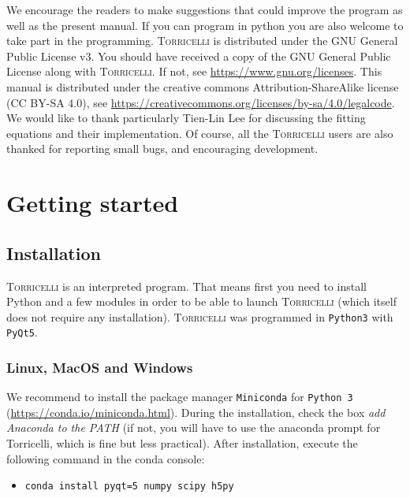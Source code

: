 \documentclass[oldfontcommands,openany,oneside]{memoir}
\begin{document}
We encourage the readers to make suggestions that could improve the program as well as the present manual. If you can program in python you are also welcome to take part in the programming. \textsc{Torricelli} is distributed under the GNU General Public License v3. You should have received a copy of the GNU General Public License along with \textsc{Torricelli}.  If not, see \url{https://www.gnu.org/licenses}. This manual is distributed under the creative commons Attribution-ShareAlike license (CC BY-SA 4.0), see \url{https://creativecommons.org/licenses/by-sa/4.0/legalcode}.\\

We would like to thank particularly Tien-Lin Lee for discussing the fitting equations and their implementation. Of course, all the \textsc{Torricelli} users are also thanked for reporting small bugs, and encouraging development. \newpage

\tableofcontents
\mainmatter

\chapter{Getting started}
\section{Installation} %
\textsc{Torricelli} is an interpreted program. That means first you need to install Python and a few modules in order to be able to launch \textsc{Torricelli} (which itself does not require any installation). \textsc{Torricelli} was programmed in \texttt{Python3} with \texttt{PyQt5}. 

\subsection{Linux, MacOS and Windows}
We recommend to install the package manager \verb+Miniconda+  for \verb+Python 3+ (\href{https://conda.io/miniconda.html}{https://conda.io/miniconda.html}). During the installation, check the box \emph{add Anaconda to the PATH} (if not, you will have to use the anaconda prompt for Torricelli, which is fine but less practical). After installation, execute the following command in the conda console:
\begin{itemize}
\item \texttt{conda install pyqt=5 numpy scipy h5py}
\end{itemize}
\end{document}
